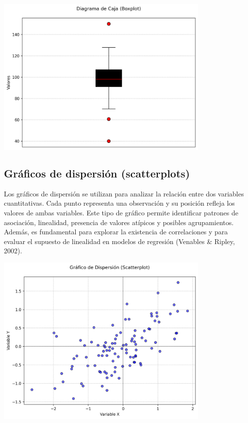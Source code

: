 \documentclass[
  spanish,
  a4paper,
  DIV=11,
  numbers=noendperiod,
  onepage,
  openany]{scrreprt}
\begin{document}
\begin{center}
\includegraphics[width=4.16667in,height=\textheight,keepaspectratio]{images/boxplot.png}
\end{center}

\subsection{Gráficos de dispersión
(scatterplots)}\label{gruxe1ficos-de-dispersiuxf3n-scatterplots}

Los gráficos de dispersión se utilizan para analizar la relación entre
dos variables cuantitativas. Cada punto representa una observación y su
posición refleja los valores de ambas variables. Este tipo de gráfico
permite identificar patrones de asociación, linealidad, presencia de
valores atípicos y posibles agrupamientos. Además, es fundamental para
explorar la existencia de correlaciones y para evaluar el supuesto de
linealidad en modelos de regresión (Venables \& Ripley, 2002).

\begin{center}
\includegraphics[width=4.16667in,height=\textheight,keepaspectratio]{images/scatterplot.png}
\end{center}
\end{document}
